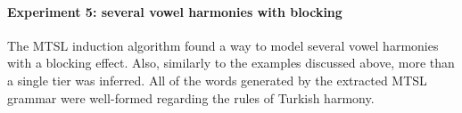 \begin{table}[h!]
\centering
{}
\caption{MTSL learning of several vowel harmonies without blockers; abstract representation.}
\end{table}



\paragraph{Experiment 5: several vowel harmonies with blocking}

The MTSL induction algorithm found a way to model several vowel harmonies with a blocking effect.
Also, similarly to the examples discussed above, more than a single tier was inferred.
All of the words generated by the extracted MTSL grammar were well-formed regarding the rules of Turkish harmony.

